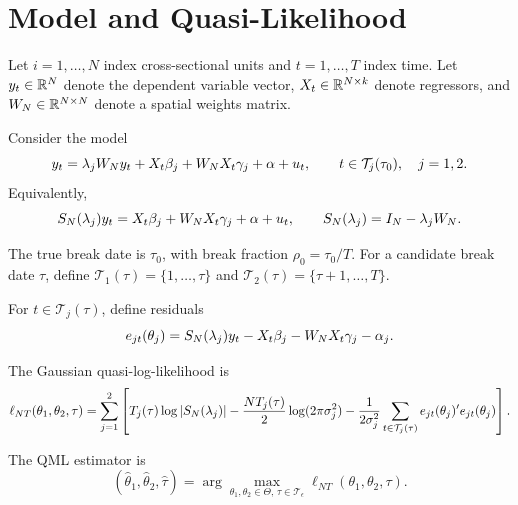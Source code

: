\section{Model and Quasi-Likelihood}\label{sec:model-likelihood}

Let $i=1,\ldots,N$ index cross-sectional units and $t=1,\ldots,T$ index time. Let $y_t\in\mathbb{R}^N$ denote the dependent variable vector, $X_t\in\mathbb{R}^{N\times k}$ denote regressors, and $W_N\in\mathbb{R}^{N\times N}$ denote a spatial weights matrix.

Consider the model
\begin{equation}
 y_t = \lambda_j W_N y_t + X_t\beta_j + W_N X_t\gamma_j + \alpha + u_t,
 \qquad t\in\mathcal{T}_j(\tau_0),\quad j=1,2.
 \label{eq:model-baseline}
\end{equation}
Equivalently,
\begin{equation}
 S_N(\lambda_j)y_t = X_t\beta_j + W_N X_t\gamma_j + \alpha + u_t,
 \qquad S_N(\lambda_j)=I_N-\lambda_jW_N.
 \label{eq:transformed-model}
\end{equation}

The true break date is $\tau_0$, with break fraction $\rho_0=\tau_0/T$. For a candidate break date $\tau$, define $\mathcal{T}_1(\tau)=\{1,\ldots,\tau\}$ and $\mathcal{T}_2(\tau)=\{\tau+1,\ldots,T\}$.

For $t\in\mathcal{T}_j(\tau)$, define residuals
\begin{equation}
 e_{jt}(\theta_j)=S_N(\lambda_j)y_t-X_t\beta_j-W_N X_t\gamma_j-\alpha_j.
 \label{eq:residual}
\end{equation}

The Gaussian quasi-log-likelihood is
\begin{equation}
\ell_{NT}(\theta_1,\theta_2,\tau)
=\sum_{j=1}^2\left[
T_j(\tau)\log|S_N(\lambda_j)|
-\frac{NT_j(\tau)}{2}\log(2\pi\sigma_j^2)
-\frac{1}{2\sigma_j^2}\sum_{t\in\mathcal{T}_j(\tau)}e_{jt}(\theta_j)'e_{jt}(\theta_j)
\right].
\label{eq:loglik}
\end{equation}

The QML estimator is
\begin{equation}
(\widehat\theta_1,\widehat\theta_2,\widehat\tau)
=\arg\max_{\theta_1,\theta_2\in\Theta,\,\tau\in\mathcal{T}_\epsilon}
\ell_{NT}(\theta_1,\theta_2,\tau).
\label{eq:qml-estimator}
\end{equation}


